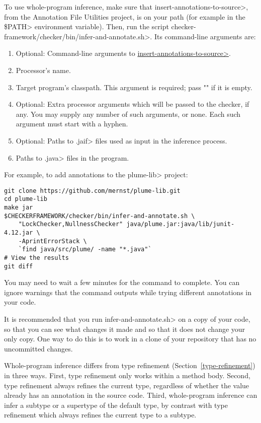 \begin{sloppypar}
To use whole-program inference, make sure that
\<insert-annotations-to-source>, from the Annotation File Utilities project,
is on your path (for example in the \<\$PATH> environment variable).
Then, run the script \<checker-framework/checker/bin/infer-and-annotate.sh>.
Its command-line arguments are:
\end{sloppypar}

\begin{enumerate}
\item Optional: Command-line arguments to
  \href{https://checkerframework.org/annotation-file-utilities/#insert-annotations-to-source}{\<insert-annotations-to-source>}.
\item Processor's name.
\item Target program's classpath.  This argument is required; pass "" if it
  is empty.
\item Optional: Extra processor arguments which will be passed to the checker, if any.
  You may supply any number of such arguments, or none.  Each such argument
  must start with a hyphen.
\item Optional: Paths to \<.jaif> files used as input in the inference
    process.
\item Paths to \<.java> files in the program.
\end{enumerate}

For example, to add annotations to the \<plume-lib> project:
\begin{Verbatim}
git clone https://github.com/mernst/plume-lib.git
cd plume-lib
make jar
$CHECKERFRAMEWORK/checker/bin/infer-and-annotate.sh \
    "LockChecker,NullnessChecker" java/plume.jar:java/lib/junit-4.12.jar \
    -AprintErrorStack \
    `find java/src/plume/ -name "*.java"`
# View the results
git diff
\end{Verbatim}

You may need to wait a few minutes for the command to complete.
You can ignore warnings that the command outputs while trying different
annotations in your code.

It is recommended that you run \<infer-and-annotate.sh> on a copy of your
code, so that you can see what changes it made and so that it does not
change your only copy.  One way to do this is to work in a clone of your
repository that has no uncommitted changes.

Whole-program inference differs from type refinement (Section~\ref{type-refinement})
in three ways.  First, type refinement only works within a method body.
Second, type refinement always
refines the current type, regardless of whether the value already has an
annotation in the source code.
Third, whole-program inference can infer a subtype
or a supertype of the default type, by contrast with type refinement which
always refines the current type to a subtype.


